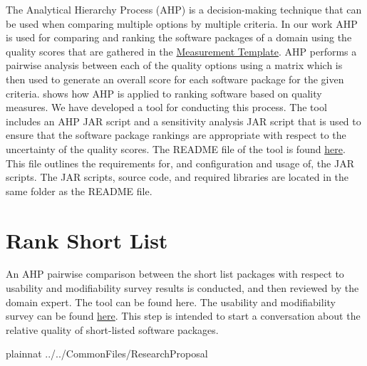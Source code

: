 \documentclass[letterpaper,cleveref]{lipics-v2019}
\theoremstyle{definition}
\begin{document}
The Analytical Hierarchy Process (AHP) is a decision-making technique that can
be used when comparing multiple options by multiple criteria. In our work AHP is
used for comparing and ranking the software packages of a domain using the
quality scores that are gathered in the
\href{https://github.com/smiths/AIMSS/blob/master/StateOfPractice/Methodology/Combined_MeasurementTemplate_EmpiricalMeasures.xlsx}
{Measurement Template}. AHP performs a pairwise analysis between each of the
quality options using a matrix which is then used to generate an overall score
for each software package for the given criteria. \cite{SmithEtAl2016} shows how
AHP is applied to ranking software based on quality measures. We have developed
a tool for conducting this process. The tool includes an AHP JAR script and a
sensitivity analysis JAR script that is used to ensure that the software package
rankings are appropriate with respect to the uncertainty of the quality
scores. The README file of the tool is found
\href{https://github.com/smiths/AIMSS/blob/master/StateOfPractice/AHP2020/LBM/README.txt}{here}. This
file outlines the requirements for, and configuration and usage of, the JAR
scripts. The JAR scripts, source code, and required libraries are located in the
same folder as the README file.

\section{Rank Short List} \label{SecRankShortList}

An AHP pairwise comparison between the short list packages with respect to
usability and modifiability survey results is conducted, and then reviewed by
the domain expert. The tool can be found here. The usability and modifiability
survey can be found
\href{https://github.com/smiths/AIMSS/blob/master/StateOfPractice/Methodology/Experiments.pdf}
{here}. This step is intended to start a conversation about the relative quality
of short-listed software packages.

\newpage

\appendix

\newpage

 {plainnat}
 {../../CommonFiles/ResearchProposal}
\end{document}
